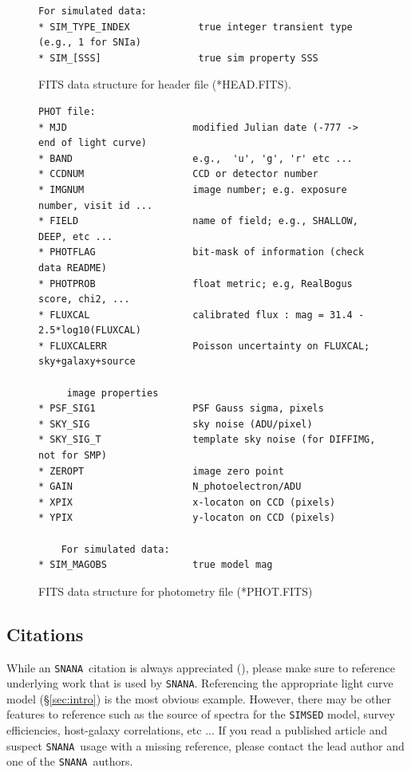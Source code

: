 \documentclass[12pt]{article}
\newcommand{\snana}{{\tt SNANA}}
\begin{document}
{\begin{figure} [ht]
\begin{center}
\begin{Verbatim}[frame=single]
     For simulated data:
* SIM_TYPE_INDEX            true integer transient type (e.g., 1 for SNIa)
* SIM_[SSS]                 true sim property SSS
\end{Verbatim}
\end{center}
\vspace{-0.5cm}
\caption{
  FITS data structure for header file (*HEAD.FITS).
 }
\label{fig:data_format_head}
\end{figure}
%
%
\begin{figure} [ht] 
\begin{center}
\begin{Verbatim}[frame=single]
PHOT file:
* MJD                      modified Julian date (-777 -> end of light curve)
* BAND                     e.g.,  'u', 'g', 'r' etc ...
* CCDNUM                   CCD or detector number
* IMGNUM                   image number; e.g. exposure number, visit id ...
* FIELD                    name of field; e.g., SHALLOW, DEEP, etc ...
* PHOTFLAG                 bit-mask of information (check data README)
* PHOTPROB                 float metric; e.g, RealBogus score, chi2, ...
* FLUXCAL                  calibrated flux : mag = 31.4 - 2.5*log10(FLUXCAL)
* FLUXCALERR               Poisson uncertainty on FLUXCAL; sky+galaxy+source

     image properties
* PSF_SIG1                 PSF Gauss sigma, pixels
* SKY_SIG                  sky noise (ADU/pixel)
* SKY_SIG_T                template sky noise (for DIFFIMG, not for SMP)
* ZEROPT                   image zero point
* GAIN                     N_photoelectron/ADU
* XPIX                     x-locaton on CCD (pixels)
* YPIX                     y-locaton on CCD (pixels)

    For simulated data:
* SIM_MAGOBS               true model mag
\end{Verbatim}
\end{center}
\vspace{-0.5cm}
\caption{
  FITS data structure for photometry file (*PHOT.FITS)
 }
\label{fig:data_format_phot}
\end{figure}

\bigskip\bigskip

\subsection{Citations}
\label{subsec:cite}

While an \snana\ citation is always appreciated
(\cite{SNANA09}), please make sure to reference 
underlying work that is used by \snana.
Referencing the appropriate light curve model 
(\S\ref{sec:intro}) is the most obvious example.
However, there may be other features to reference such as 
the source of spectra for the {\tt SIMSED} model,
survey efficiencies,
host-galaxy correlations, 
etc ...
If you read a published article and suspect \snana\ usage 
with a missing reference, please contact the lead author
and one of the \snana\ authors.

}
\end{document}
